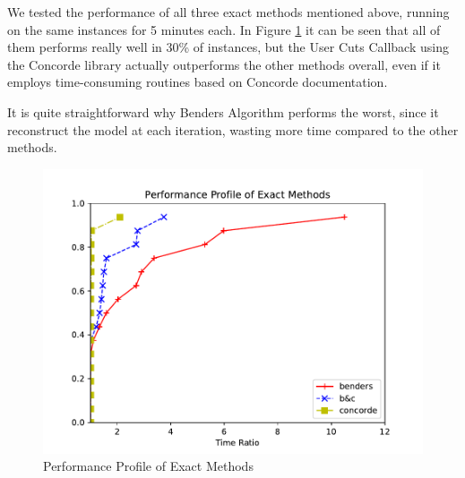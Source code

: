 We tested the performance of all three exact methods mentioned above, running on the same instances for 5 minutes each. In Figure \ref{fig:exact} it can be seen that all of them performs really well in 30\% of instances, but the User Cuts Callback using the Concorde library actually outperforms the other methods overall, even if it employs time-consuming routines based on Concorde documentation.

It is quite straightforward why Benders Algorithm performs the worst, since it reconstruct the model at each iteration, wasting more time compared to the other methods.

\begin{figure}[!h]
    \centering
    \includegraphics[width=\textwidth]{images/exact.pdf}
    \caption{Performance Profile of Exact Methods}
    \label{fig:exact}
\end{figure}
